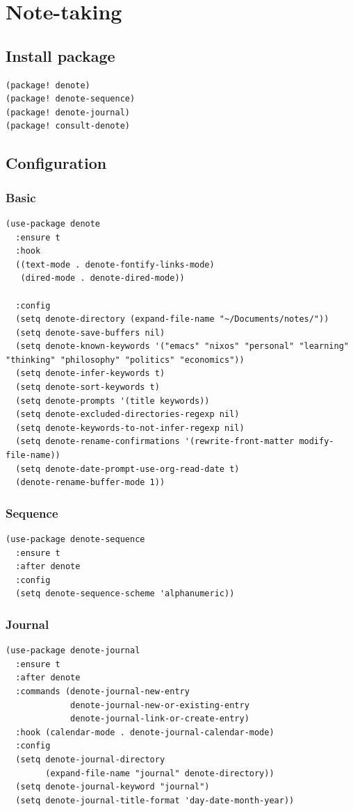 \documentclass[11pt]{article}
\begin{document}
\section{Note-taking}
\label{sec:orgacaddf7}
\subsection{Install package}
\label{sec:org7c3ebcd}

\begin{verbatim}
(package! denote)
(package! denote-sequence)
(package! denote-journal)
(package! consult-denote)
\end{verbatim}
\subsection{Configuration}
\label{sec:org703695a}
\subsubsection{Basic}
\label{sec:org10e584c}
\begin{verbatim}
(use-package denote
  :ensure t
  :hook
  ((text-mode . denote-fontify-links-mode)
   (dired-mode . denote-dired-mode))

  :config
  (setq denote-directory (expand-file-name "~/Documents/notes/"))
  (setq denote-save-buffers nil)
  (setq denote-known-keywords '("emacs" "nixos" "personal" "learning" "thinking" "philosophy" "politics" "economics"))
  (setq denote-infer-keywords t)
  (setq denote-sort-keywords t)
  (setq denote-prompts '(title keywords))
  (setq denote-excluded-directories-regexp nil)
  (setq denote-keywords-to-not-infer-regexp nil)
  (setq denote-rename-confirmations '(rewrite-front-matter modify-file-name))
  (setq denote-date-prompt-use-org-read-date t)
  (denote-rename-buffer-mode 1))
\end{verbatim}
\subsubsection{Sequence}
\label{sec:org8a236c8}
\begin{verbatim}
(use-package denote-sequence
  :ensure t
  :after denote
  :config
  (setq denote-sequence-scheme 'alphanumeric))
\end{verbatim}
\subsubsection{Journal}
\label{sec:org446e2bf}
\begin{verbatim}
(use-package denote-journal
  :ensure t
  :after denote
  :commands (denote-journal-new-entry
             denote-journal-new-or-existing-entry
             denote-journal-link-or-create-entry)
  :hook (calendar-mode . denote-journal-calendar-mode)
  :config
  (setq denote-journal-directory
        (expand-file-name "journal" denote-directory))
  (setq denote-journal-keyword "journal")
  (setq denote-journal-title-format 'day-date-month-year))
\end{verbatim}
\end{document}
